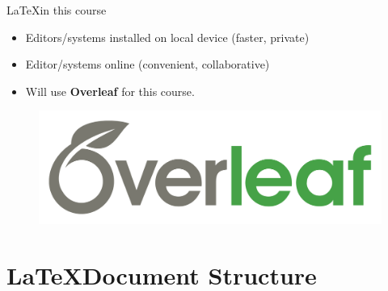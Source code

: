 \documentclass{beamer}
\begin{document}
{  \begin{frame}{\LaTeX in this course}
    \begin{itemize}
      \item Editors/systems installed on local device (faster, private)
      \pause
      \item Editor/systems online (convenient, collaborative)
      \pause
      \item Will use \textbf{Overleaf} for this course.
    \end{itemize}
    \begin{figure}
      \includegraphics[width=0.6\linewidth]{overleaf.png}
    \end{figure}
  \end{frame}

  \section{\LaTeX Document Structure}

} %
\end{document}
